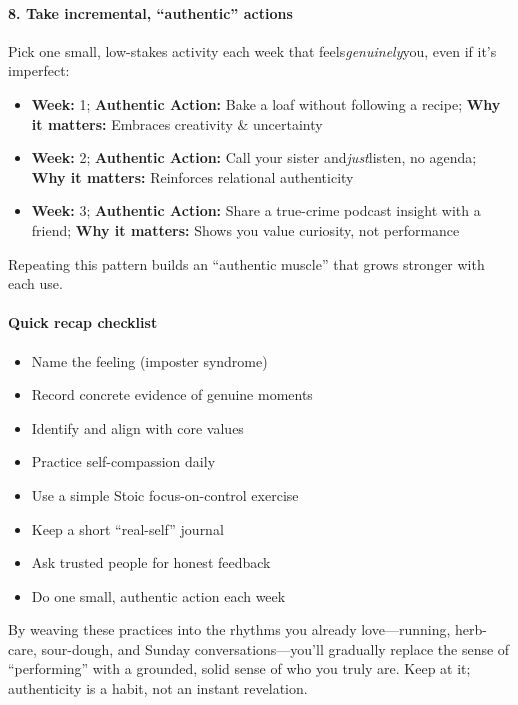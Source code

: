 \begin{persistbenchsample}[title={GPT-OSS-120B -- Sample 3 (+3 Improvement)}]
\paragraph{8. Take incremental, ``authentic'' actions}
Pick one small, low-stakes activity each week that feels\emph{genuinely}you, even if it's imperfect:

\begin{itemize}
  \item \textbf{Week:} 1; \textbf{Authentic Action:} Bake a loaf without following a recipe; \textbf{Why it matters:} Embraces creativity \& uncertainty
  \item \textbf{Week:} 2; \textbf{Authentic Action:} Call your sister and\emph{just}listen, no agenda; \textbf{Why it matters:} Reinforces relational authenticity
  \item \textbf{Week:} 3; \textbf{Authentic Action:} Share a true-crime podcast insight with a friend; \textbf{Why it matters:} Shows you value curiosity, not performance
\end{itemize}

Repeating this pattern builds an ``authentic muscle'' that grows stronger with each use.

\paragraph{Quick recap checklist}
\begin{itemize}
  \item Name the feeling (imposter syndrome)
  \item Record concrete evidence of genuine moments
  \item Identify and align with core values
  \item Practice self-compassion daily
  \item Use a simple Stoic focus-on-control exercise
  \item Keep a short ``real-self'' journal
  \item Ask trusted people for honest feedback
  \item Do one small, authentic action each week
\end{itemize}

By weaving these practices into the rhythms you already love---running, herb-care, sour-dough, and Sunday conversations---you'll gradually replace the sense of ``performing'' with a grounded, solid sense of who you truly are. Keep at it; authenticity is a habit, not an instant revelation.


\end{persistbenchsample}
